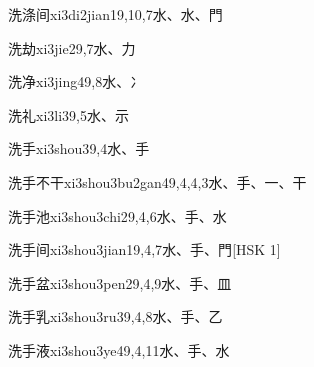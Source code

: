 \begin{entry}{洗涤间}{xi3di2jian1}{9,10,7}{⽔、⽔、⾨}
\end{entry}

\begin{entry}{洗劫}{xi3jie2}{9,7}{⽔、⼒}
\end{entry}

\begin{entry}{洗净}{xi3jing4}{9,8}{⽔、⼎}
\end{entry}

\begin{entry}{洗礼}{xi3li3}{9,5}{⽔、⽰}
\end{entry}

\begin{entry}{洗手}{xi3shou3}{9,4}{⽔、⼿}
\end{entry}

\begin{entry}{洗手不干}{xi3shou3bu2gan4}{9,4,4,3}{⽔、⼿、⼀、⼲}
\end{entry}

\begin{entry}{洗手池}{xi3shou3chi2}{9,4,6}{⽔、⼿、⽔}
\end{entry}

\begin{entry}{洗手间}{xi3shou3jian1}{9,4,7}{⽔、⼿、⾨}[HSK 1]
\end{entry}

\begin{entry}{洗手盆}{xi3shou3pen2}{9,4,9}{⽔、⼿、⽫}
\end{entry}

\begin{entry}{洗手乳}{xi3shou3ru3}{9,4,8}{⽔、⼿、⼄}
\end{entry}

\begin{entry}{洗手液}{xi3shou3ye4}{9,4,11}{⽔、⼿、⽔}
\end{entry}

